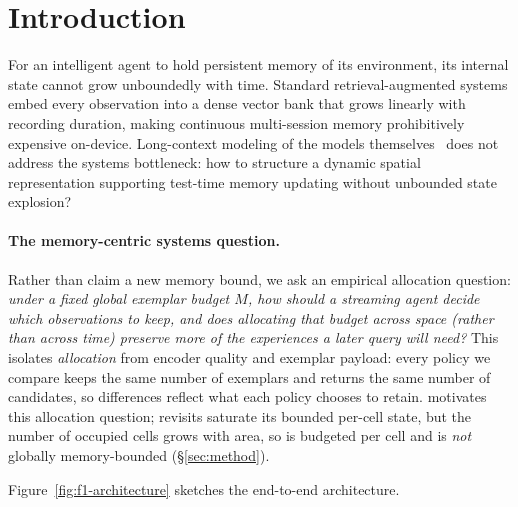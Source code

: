 
\section{Introduction}
\label{sec:intro}

For an intelligent agent to hold persistent memory of its environment, its internal state cannot grow unboundedly with time. Standard retrieval-augmented systems embed every observation into a dense vector bank that grows linearly with recording duration, making continuous multi-session memory prohibitively expensive on-device. Long-context modeling of the models themselves~\cite{arora2024linear} does not address the systems bottleneck: how to structure a dynamic spatial representation supporting test-time memory updating without unbounded state explosion?

\paragraph{The memory-centric systems question.}
Rather than claim a new memory bound, we ask an empirical allocation question:
\emph{under a fixed global exemplar budget $M$, how should a streaming agent
decide which observations to keep, and does allocating that budget across space
(rather than across time) preserve more of the experiences a later query will
need?} This isolates \emph{allocation} from encoder quality and exemplar payload:
every policy we compare keeps the same number of exemplars and returns
the same number of candidates, so differences reflect what each policy chooses
to retain. \psm{} motivates this allocation question; revisits saturate its bounded
per-cell state, but the number of occupied cells grows with area, so \psm{} is
budgeted per cell and is \emph{not} globally
memory-bounded (\S\ref{sec:method}).


Figure~\ref{fig:f1-architecture} sketches the end-to-end architecture.


